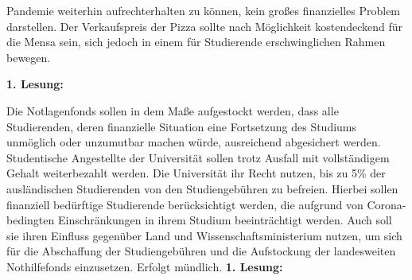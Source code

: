 {\begin{enumerate}
{                    Pandemie weiterhin aufrechterhalten zu können, kein großes finanzielles Problem darstellen. Der
                    Verkaufspreis der Pizza sollte nach Möglichkeit kostendeckend für die Mensa sein, sich jedoch in
                    einem für Studierende erschwinglichen Rahmen bewegen.
                }
            \end{enumerate}
        }{
            \textbf{1. Lesung:}
            \ul{}
        }{
        }
    
    {
        Die Notlagenfonds sollen in dem Maße aufgestockt werden, dass alle Studierenden,
        deren
        finanzielle Situation eine Fortsetzung des Studiums unmöglich oder unzumutbar machen
        würde,
        ausreichend abgesichert werden. Studentische Angestellte der Universität sollen trotz
        Ausfall mit
        vollständigem Gehalt weiterbezahlt werden.
        Die Universität ihr Recht nutzen, bis zu 5\% der ausländischen Studierenden von den
        Studiengebühren zu befreien. Hierbei sollen finanziell bedürftige Studierende
        berücksichtigt
        werden, die aufgrund von Corona-bedingten Einschränkungen in ihrem Studium
        beeinträchtigt
        werden. Auch soll sie ihren Einfluss gegenüber Land und Wissenschaftsministerium
        nutzen, um
        sich für die Abschaffung der Studiengebühren und die Aufstockung der landesweiten
        Nothilfefonds
        einzusetzen.
    }{
        Erfolgt mündlich.
    }{
        \textbf{1. Lesung:}
        \ul{}
    }{
    }
